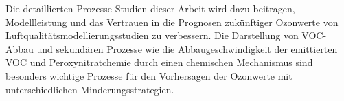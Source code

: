 Die detaillierten Prozesse Studien dieser Arbeit wird dazu beitragen, Modellleistung und das Vertrauen in die Prognosen zukünftiger Ozonwerte von Luftqualitätsmodellierungsstudien zu verbessern.
Die Darstellung von VOC-Abbau und sekundären Prozesse wie die Abbaugeschwindigkeit der emittierten VOC und Peroxynitratchemie durch einen chemischen Mechanismus sind besonders wichtige Prozesse für den Vorhersagen der Ozonwerte mit unterschiedlichen Minderungsstrategien.
